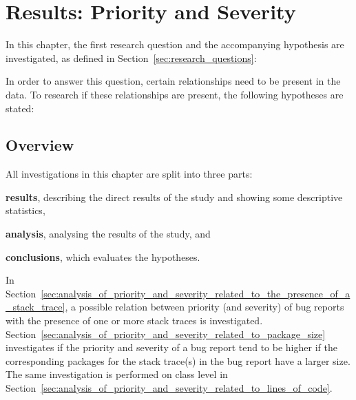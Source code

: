 
\chapter{Results: Priority and Severity} %
\label{cha:results_priority_and_severity}

In this chapter, the first research question and the accompanying hypothesis are investigated, as defined in Section~\ref{sec:research_questions}:

\vspace{\baselineskip}
\questiona{}
\vspace{\baselineskip}

\noindent
In order to answer this question, certain relationships need to be present in the data. To research if these relationships are present, the following hypotheses are stated:

\vspace{\baselineskip}
\hypaa{}

\vspace{\baselineskip}
\hypab{}

\vspace{\baselineskip}
\hypac{}

\vspace{\baselineskip}
\hypad{}

\vspace{\baselineskip}
\hypae{}

\vspace{\baselineskip}
\hypaf{}

\vspace{\baselineskip}

\section{Overview} %
All investigations in this chapter are split into three parts: 
\begin{inparaenum}[(1)]
\item \textbf{results}, describing the direct results of the study and showing some descriptive statistics,
\item \textbf{analysis}, analysing the results of the study, and
\item \textbf{conclusions}, which evaluates the hypotheses.
\end{inparaenum}

In Section~\ref{sec:analysis_of_priority_and_severity_related_to_the_presence_of_a_stack_trace}, a possible relation between priority (and severity) of bug reports with the presence of one or more stack traces is investigated. Section~\ref{sec:analysis_of_priority_and_severity_related_to_package_size} investigates if the priority and severity of a bug report tend to be higher if the corresponding packages for the stack trace(s) in the bug report have a larger size. The same investigation is performed on class level in Section~\ref{sec:analysis_of_priority_and_severity_related_to_lines_of_code}.

